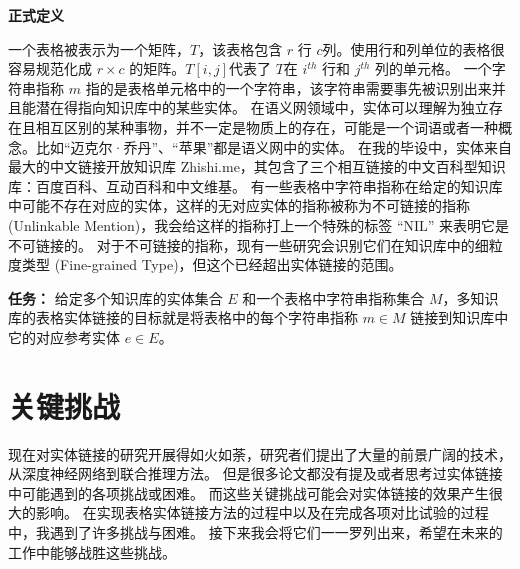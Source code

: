 \noindent\textbf{正式定义}

一个表格被表示为一个矩阵，$T$，该表格包含 $r$ 行 $c$列。使用行和列单位的表格很容易规范化成 $r\times{c}$ 的矩阵。$T[i,j]$代表了 $T$在 $i^{th}$ 行和 $j^{th}$ 列的单元格。
一个字符串指称 $m$ 指的是表格单元格中的一个字符串，该字符串需要事先被识别出来并且能潜在得指向知识库中的某些实体。
在语义网领域中，实体可以理解为独立存在且相互区别的某种事物，并不一定是物质上的存在，可能是一个词语或者一种概念。比如``迈克尔·乔丹''、``苹果''都是语义网中的实体。
在我的毕设中，实体来自最大的中文链接开放知识库 Zhishi.me\cite{niu2011zhishi}，其包含了三个相互链接的中文百科型知识库：百度百科、互动百科和中文维基。
有一些表格中字符串指称在给定的知识库中可能不存在对应的实体，这样的无对应实体的指称被称为不可链接的指称 (Unlinkable Mention)，我会给这样的指称打上一个特殊的标签 ``NIL'' 来表明它是不可链接的。
对于不可链接的指称，现有一些研究\cite{shen2012graph}\cite{ling2012fine}会识别它们在知识库中的细粒度类型 (Fine-grained Type)，但这个已经超出实体链接的范围。\newline

\noindent\textbf{任务：} 给定多个知识库的实体集合 $E$ 和一个表格中字符串指称集合 $M$，多知识库的表格实体链接的目标就是将表格中的每个字符串指称 $m \in M$ 链接到知识库中它的对应参考实体 $e \in E$。


\section{关键挑战}\label{challenge}

现在对实体链接的研究开展得如火如荼，研究者们提出了大量的前景广阔的技术，从深度神经网络到联合推理方法。
但是很多论文都没有提及或者思考过实体链接中可能遇到的各项挑战或困难。
而这些关键挑战可能会对实体链接的效果产生很大的影响。
在实现表格实体链接方法的过程中以及在完成各项对比试验的过程中，我遇到了许多挑战与困难。
接下来我会将它们一一罗列出来，希望在未来的工作中能够战胜这些挑战。\par

